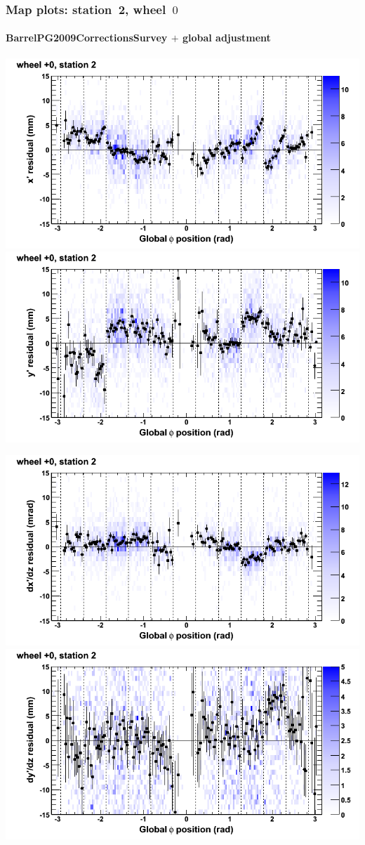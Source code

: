\documentclass[compress]{beamer}
\begin{document}
\begin{frame}
\frametitle{Map plots: station~2, wheel~$0$}
\framesubtitle{BarrelPG2009CorrectionsSurvey $+$ global adjustment}
\includegraphics[width=0.5\linewidth]{mapplots_re01/DTvsphi_st2whC_x.png}
\includegraphics[width=0.5\linewidth]{mapplots_re01/DTvsphi_st2whC_y.png}

\includegraphics[width=0.5\linewidth]{mapplots_re01/DTvsphi_st2whC_dxdz.png}
\includegraphics[width=0.5\linewidth]{mapplots_re01/DTvsphi_st2whC_dydz.png}
\end{frame}
\end{document}
